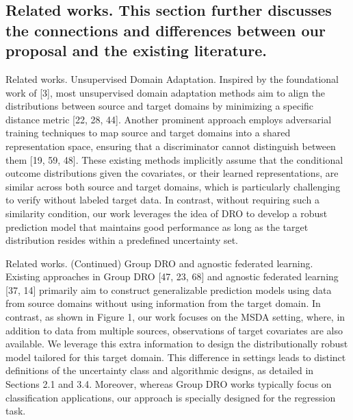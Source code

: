 \documentclass{beamer}
\begin{document}
\subsection{Related works. This section further discusses the connections and differences between our proposal and the existing literature.}

\begin{frame}{Related works.}
    Unsupervised Domain Adaptation. Inspired by the foundational work of [3], most unsupervised domain adaptation methods aim to align the distributions between source and target domains by minimizing a specific distance metric [22, 28, 44]. Another prominent approach employs adversarial training techniques to map source and target domains into a shared representation space, ensuring that a discriminator cannot distinguish between them [19, 59, 48]. These existing methods implicitly assume that the conditional outcome distributions given the covariates, or their learned representations, are similar across both source and target domains, which is particularly challenging to verify without labeled target data. In contrast, without requiring such a similarity condition, our work leverages the idea of DRO to develop a robust prediction model that maintains good performance as long as the target distribution resides within a predefined uncertainty set.
\end{frame}

\begin{frame}{Related works. (Continued)}
    Group DRO and agnostic federated learning. Existing approaches in Group DRO [47, 23, 68] and agnostic federated learning [37, 14] primarily aim to construct generalizable prediction models using data from source domains without using information from the target domain. In contrast, as shown in Figure 1, our work focuses on the MSDA setting, where, in addition to data from multiple sources, observations of target covariates are also available. We leverage this extra information to design the distributionally robust model tailored for this target domain. This difference in settings leads to distinct definitions of the uncertainty class and algorithmic designs, as detailed in Sections 2.1 and 3.4. Moreover, whereas Group DRO works typically focus on classification applications, our approach is specially designed for the regression task.
\end{frame}
\end{document}
